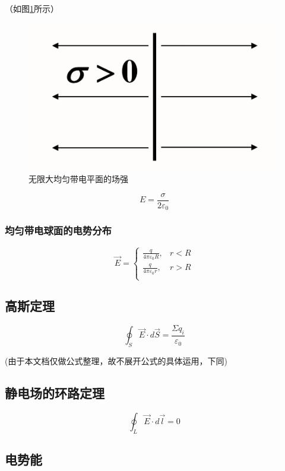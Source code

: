 \documentclass{ctexart}
\begin{document}
（如图\ref{figure4}所示）

\begin{figure}[h]
	\centering
	\includegraphics[scale=0.2]{images//chapter_10//figure_10.4.jpg} 
	\caption{无限大均匀带电平面的场强}\label{figure4}
\end{figure}

$$E=\frac{\sigma}{2\varepsilon_0}$$

\subsubsection{均匀带电球面的电势分布}

\begin{equation*}
\vec{E}=
	\begin{cases}
\frac{q}{4\pi \varepsilon_0R},&r<R\\
\frac{q}{4\pi \varepsilon_0r},&r>R\\
\end{cases}
\end{equation*}

\subsection{高斯定理}

$$\oint_{S}\vec{E}\cdot d\vec{S}=\frac{\Sigma q_i}{\varepsilon_0}$$

(由于本文档仅做公式整理，故不展开公式的具体运用，下同)

\subsection{静电场的环路定理}

$$\oint_{L}\vec{E}\cdot d\vec{l}=0$$

\subsection{电势能}
\end{document}

